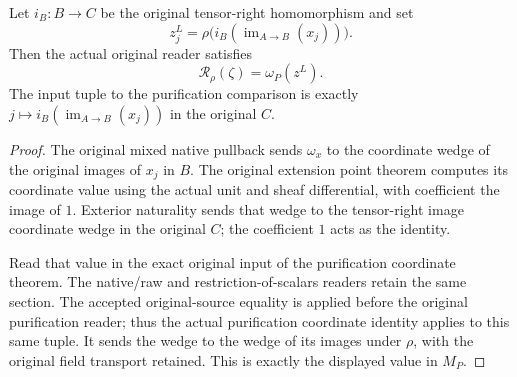 \begin{lemma}
\label{lem:kn-mixed-native-coordinate-left-value}
\leanok
Let $i_B:B\to C$ be the original tensor-right homomorphism and set
\[
 z^L_j=\rho\bigl(i_B(\operatorname{im}_{A\to B}(x_j))\bigr).
\]
Then the actual original reader satisfies
\[
 \mathcal R_\rho(\zeta)=\omega_P(z^L).
\]
The input tuple to the purification comparison is exactly
$j\mapsto i_B(\operatorname{im}_{A\to B}(x_j))$ in the original $C$.
\end{lemma}
\begin{proof}
The original mixed native pullback sends $\omega_x$ to the coordinate
wedge of the original images of $x_j$ in $B$. The original extension
point theorem computes its coordinate value using the actual unit and
sheaf differential, with coefficient the image of $1$. Exterior
naturality sends that wedge to the tensor-right image coordinate wedge
in the original $C$; the coefficient $1$ acts as the identity.

Read that value in the exact original input of the purification
coordinate theorem. The native/raw and restriction-of-scalars readers
retain the same section. The accepted original-source equality is
applied before the original purification reader; thus the actual
purification coordinate identity applies to this same tuple. It sends
the wedge to the wedge of its images under $\rho$, with the original
field transport retained. This is exactly the displayed value in $M_P$.
\end{proof}

